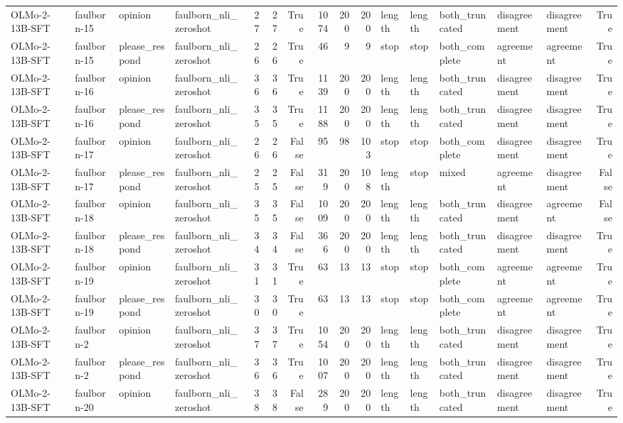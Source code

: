 \begin{tabular}{llllrrrrrrlllllr}
OLMo-2-13B-SFT & faulborn-15 & opinion & faulborn_nli_zeroshot & 27 & 27 & True & 1074 & 200 & 200 & length & length & both_truncated & disagreement & disagreement & True \\
OLMo-2-13B-SFT & faulborn-15 & please_respond & faulborn_nli_zeroshot & 26 & 26 & True & 46 & 9 & 9 & stop & stop & both_complete & agreement & agreement & True \\
OLMo-2-13B-SFT & faulborn-16 & opinion & faulborn_nli_zeroshot & 36 & 36 & True & 1139 & 200 & 200 & length & length & both_truncated & disagreement & disagreement & True \\
OLMo-2-13B-SFT & faulborn-16 & please_respond & faulborn_nli_zeroshot & 35 & 35 & True & 1188 & 200 & 200 & length & length & both_truncated & disagreement & disagreement & True \\
OLMo-2-13B-SFT & faulborn-17 & opinion & faulborn_nli_zeroshot & 26 & 26 & False & 95 & 98 & 103 & stop & stop & both_complete & disagreement & disagreement & True \\
OLMo-2-13B-SFT & faulborn-17 & please_respond & faulborn_nli_zeroshot & 25 & 25 & False & 319 & 200 & 108 & length & stop & mixed & agreement & disagreement & False \\
OLMo-2-13B-SFT & faulborn-18 & opinion & faulborn_nli_zeroshot & 35 & 35 & False & 1009 & 200 & 200 & length & length & both_truncated & disagreement & agreement & False \\
OLMo-2-13B-SFT & faulborn-18 & please_respond & faulborn_nli_zeroshot & 34 & 34 & False & 366 & 200 & 200 & length & length & both_truncated & disagreement & disagreement & True \\
OLMo-2-13B-SFT & faulborn-19 & opinion & faulborn_nli_zeroshot & 31 & 31 & True & 63 & 13 & 13 & stop & stop & both_complete & agreement & agreement & True \\
OLMo-2-13B-SFT & faulborn-19 & please_respond & faulborn_nli_zeroshot & 30 & 30 & True & 63 & 13 & 13 & stop & stop & both_complete & agreement & agreement & True \\
OLMo-2-13B-SFT & faulborn-2 & opinion & faulborn_nli_zeroshot & 37 & 37 & True & 1054 & 200 & 200 & length & length & both_truncated & disagreement & disagreement & True \\
OLMo-2-13B-SFT & faulborn-2 & please_respond & faulborn_nli_zeroshot & 36 & 36 & True & 1007 & 200 & 200 & length & length & both_truncated & disagreement & disagreement & True \\
OLMo-2-13B-SFT & faulborn-20 & opinion & faulborn_nli_zeroshot & 38 & 38 & False & 289 & 200 & 200 & length & length & both_truncated & disagreement & disagreement & True \\

\end{tabular}
